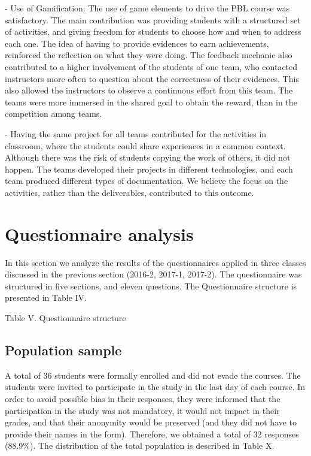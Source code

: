 -	Use of Gamification: The use of game elements to drive the PBL course was satisfactory. The main contribution was providing students with a structured set of activities, and giving freedom for students to choose how and when to address each one. The idea of having to provide evidences to earn achievements, reinforced the reflection on what they were doing. The feedback mechanic also contributed to a higher involvement of the students of one team, who contacted instructors more often to question about the correctness of their evidences. This also allowed the instructors to observe a continuous effort from this team. The teams were more immersed in the shared goal to obtain the reward, than in the competition among teams.

-	Having the same project for all teams contributed for the activities in classroom, where the students could share experiences in a common context. Although there was the risk of students copying the work of others, it did not happen. The teams developed their projects in different technologies, and each team produced different types of documentation. We believe the focus on the activities, rather than the deliverables, contributed to this outcome.

\section{Questionnaire analysis}

In this section we analyze the results of the questionnaires applied in three classes discussed in the previous section (2016-2, 2017-1, 2017-2). The questionnaire was structured in five sections, and eleven questions. The Questionnaire structure is presented in Table IV.

Table V. Questionnaire structure

\subsection{Population sample}

A total of 36 students were formally enrolled and did not evade the courses. The students were invited to participate in the study in the last day of each course. In order to avoid possible bias in their responses, they were informed that the participation in the study was not mandatory, it would not impact in their grades, and that their anonymity would be preserved (and they did not have to provide their names in the form). Therefore, we obtained a total of 32 responses (88.9\%). The distribution of the total population is described in Table X.


